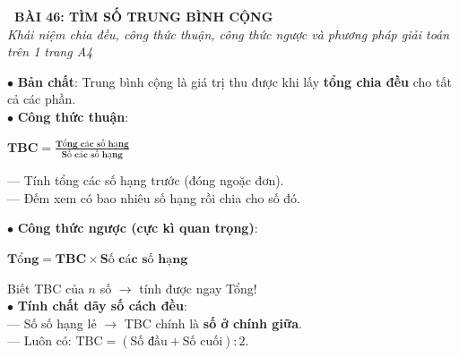 \documentclass[14pt,a4paper,oneside]{extbook}
\begin{document}
\noindent
\begin{tcolorbox}[
  enhanced,
  colback=teal!8!white,
  colframe=teal!80!black,
  arc=3mm, boxrule=1pt,
  left=3mm, right=3mm, top=2mm, bottom=2mm,
  halign=center
]
  {\Large\bfseries\color{teal!90!black}\faBookmark\ BÀI 46: TÌM SỐ TRUNG BÌNH CỘNG}\\[1.5pt]
  {\footnotesize\itshape\color{black!75} Khái niệm chia đều, công thức thuận, công thức ngược và phương pháp giải toán trên 1 trang A4}
\end{tcolorbox}

\vspace{2mm}

\noindent
\begin{minipage}[t]{0.49\textwidth}
  \begin{tcolorbox}[
    enhanced,
    title={\footnotesize\bfseries\color{white}\faBalanceScale\ 1. Bản chất \& Công thức thuận},
    colback=blue!2!white,
    colframe=blue!75!black,
    arc=2.5mm, boxrule=0.8pt, top=1.8mm, bottom=1.8mm, left=2mm, right=2mm
  ]
    \footnotesize
    $\bullet$ \textbf{Bản chất}: Trung bình cộng là giá trị thu được khi lấy \textbf{tổng chia đều} cho tất cả các phần.\\
    $\bullet$ \textbf{Công thức thuận}:
    \begin{center}
      $\mathbf{\text{TBC} = \frac{\text{Tổng các số hạng}}{\text{Số các số hạng}}}$
    \end{center}
    --- Tính tổng các số hạng trước (đóng ngoặc đơn).\\
    --- Đếm xem có bao nhiêu số hạng rồi chia cho số đó.
  \end{tcolorbox}
\end{minipage}%
\hfill
\begin{minipage}[t]{0.49\textwidth}
  \begin{tcolorbox}[
    enhanced,
    title={\footnotesize\bfseries\color{white}\faUndo\ 2. Công thức ngược \& Tính chất},
    colback=teal!2!white,
    colframe=teal!75!black,
    arc=2.5mm, boxrule=0.8pt, top=1.8mm, bottom=1.8mm, left=2mm, right=2mm
  ]
    \footnotesize
    $\bullet$ \textbf{Công thức ngược (cực kì quan trọng)}:
    \begin{center}
      $\mathbf{\text{Tổng} = \text{TBC} \times \text{Số các số hạng}}$
    \end{center}
    Biết TBC của $n$ số $\rightarrow$ tính được ngay Tổng!\\
    $\bullet$ \textbf{Tính chất dãy số cách đều}:\\
    --- Số số hạng lẻ $\rightarrow$ TBC chính là \textbf{số ở chính giữa}.\\
    --- Luôn có: $\text{TBC} = (\text{Số đầu} + \text{Số cuối}) : 2$.
  \end{tcolorbox}
\end{minipage}
\end{document}
